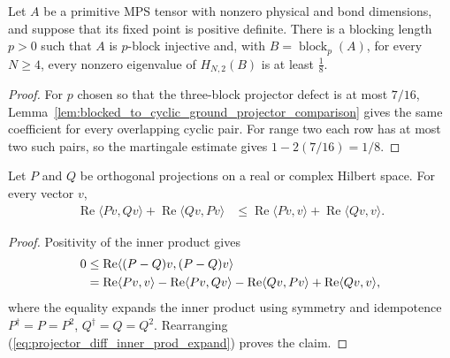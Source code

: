 \begin{lemma}
    \label{thm:martingale_mps}
    \leanok
    Let $A$ be a primitive MPS tensor with nonzero physical and bond dimensions,
    and suppose that its fixed point is positive definite.  There is a blocking
    length $p>0$ such that $A$ is $p$-block injective and, with
    $B=\operatorname{block}_p(A)$, for every $N\geq4$, every nonzero
    eigenvalue of $H_{N,2}(B)$ is at least $\tfrac18$.
\end{lemma}

\begin{proof}
    \leanok
    For $p$ chosen so that the three-block projector defect is at most $7/16$,
    Lemma~\ref{lem:blocked_to_cyclic_ground_projector_comparison} gives the same
    coefficient for every overlapping cyclic pair.  For range two each row has
    at most two such pairs, so the martingale estimate gives
    $1-2(7/16)=1/8$.
\end{proof}

\begin{lemma}
    \label{thm:projection_anticommutator_upper_bound}
    \leanok
    Let $P$ and $Q$ be orthogonal projections on a real or complex Hilbert
    space. For every vector $v$,
    \begin{align}
        \operatorname{Re}\langle Pv,Qv\rangle
        +\operatorname{Re}\langle Qv,Pv\rangle
         & \leq \operatorname{Re}\langle Pv,v\rangle
        +\operatorname{Re}\langle Qv,v\rangle.
    \end{align}
\end{lemma}

\begin{proof}
    \leanok
    Positivity of the inner product gives
    \begin{align}
        0
         & \leq \operatorname{Re}\langle(P-Q)v,(P-Q)v\rangle \notag \\
         & =\operatorname{Re}\langle Pv,v\rangle
        -\operatorname{Re}\langle Pv,Qv\rangle
        -\operatorname{Re}\langle Qv,Pv\rangle
        +\operatorname{Re}\langle Qv,v\rangle,
        \label{eq:projector_diff_inner_prod_expand}
    \end{align}
    where the equality expands the inner product using symmetry and idempotence $P^\dagger=P=P^2$, $Q^\dagger=Q=Q^2$.
    Rearranging (\ref{eq:projector_diff_inner_prod_expand}) proves the claim.
\end{proof}

